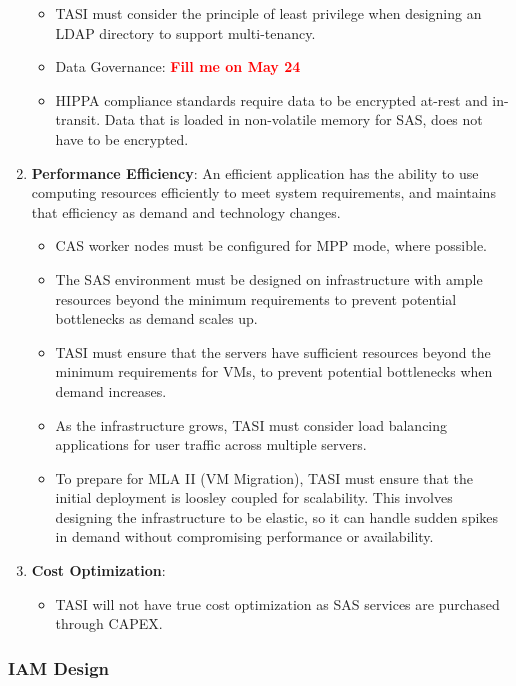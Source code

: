 \begin{enumerate}
\begin{itemize}
        \item TASI must consider the principle of least privilege when designing an LDAP directory to support multi-tenancy.
        \item Data Governance: \textbf{\textcolor{red}{Fill me on May 24}}
        \item HIPPA compliance standards require data to be encrypted at-rest and in-transit. Data that is loaded in non-volatile memory for SAS, does not have to be encrypted. 
        \end{itemize}
    \item \textbf{\textcolor{Tue-link}{Performance Efficiency}}: An efficient application has the ability to use computing resources efficiently to meet system requirements, and maintains that efficiency as demand and technology changes.
    \begin{itemize}
        \item CAS worker nodes must be configured for MPP mode, where possible. 
        \item The SAS environment must be designed on infrastructure with ample resources beyond the minimum requirements to prevent potential bottlenecks as demand scales up.
        \item TASI must ensure that the servers have sufficient resources beyond the minimum requirements for VMs, to prevent potential bottlenecks when demand increases. 
        \item As the infrastructure grows, TASI must consider load balancing applications for user traffic across multiple servers. 
        \item To prepare for MLA II (VM Migration), TASI must ensure that the initial deployment is loosley coupled for scalability. This involves designing the infrastructure to be elastic, so it can handle sudden spikes in demand without compromising performance or availability.
    \end{itemize}
    \item \textbf{\textcolor{Tue-link}{Cost Optimization}}:
    \begin{itemize}
        \item TASI will not have true cost optimization as SAS services are purchased through CAPEX.
    \end{itemize}
\end{enumerate}

\subsubsection{IAM Design}


